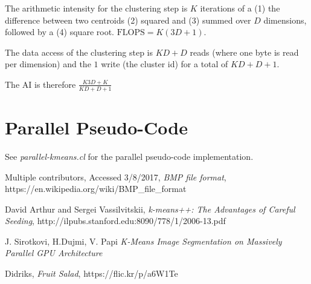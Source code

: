 \documentclass[11pt]{article}
\begin{document}
The arithmetic intensity for the clustering step is $K$ iterations of a (1) the difference between two centroids (2) squared and (3) summed over $D$ dimensions, followed by a (4) square root. $\text{FLOPS} = K(3D+1)$.

The data access of the clustering step is $KD+D$ reads (where one byte is read per dimension) and the $1$ write (the cluster id) for a total of $KD+D+1$.

The AI is therefore $\frac{K3D+K}{KD+D+1}$

\section{Parallel Pseudo-Code}

See \emph{parallel-kmeans.cl} for the parallel pseudo-code implementation.

\begin{thebibliography}{9}

  Multiple contributors,
  Accessed 3/8/2017,
  \emph{BMP file format},
  https://en.wikipedia.org/wiki/BMP_file_format

  David Arthur and Sergei Vassilvitskii,
  \emph{k-means++: The Advantages of Careful Seeding},
  http://ilpubs.stanford.edu:8090/778/1/2006-13.pdf

  J. Sirotkovi, H.Dujmi, V. Papi
  \emph{K-Means Image Segmentation on Massively Parallel GPU Architecture}

  Didriks,
  \emph{Fruit Salad},
  https://flic.kr/p/a6W1Te

\end{thebibliography}
\end{document}
